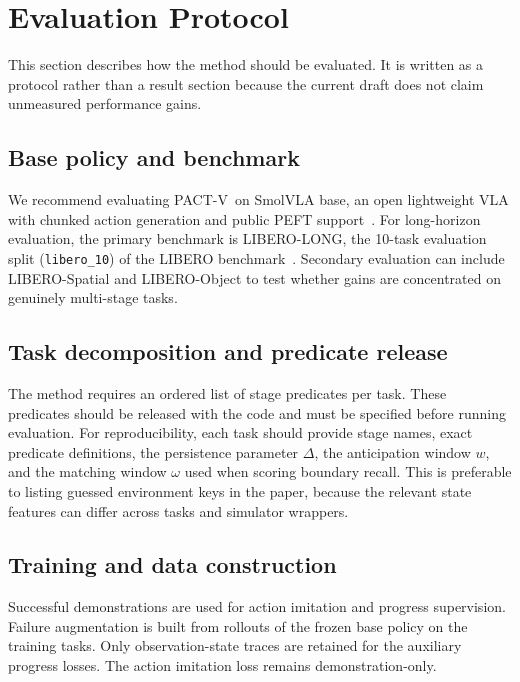 \documentclass[10pt]{article}
\newcommand{\method}{\textsc{PACT-V}\xspace}
\begin{document}
\section{Evaluation Protocol}
\label{sec:eval}

This section describes how the method should be evaluated.
It is written as a protocol rather than a result section because the current
draft does not claim unmeasured performance gains.

\subsection{Base policy and benchmark}

We recommend evaluating \method\ on SmolVLA base, an open lightweight VLA with
chunked action generation and public PEFT support~\cite{msplora}.
For long-horizon evaluation, the primary benchmark is LIBERO-LONG, the
10-task evaluation split (\texttt{libero\_10}) of the LIBERO benchmark~\cite{libero}.
Secondary evaluation can include LIBERO-Spatial and LIBERO-Object to test whether
gains are concentrated on genuinely multi-stage tasks.

\subsection{Task decomposition and predicate release}

The method requires an ordered list of stage predicates per task.
These predicates should be released with the code and must be specified before
running evaluation.
For reproducibility, each task should provide stage names, exact predicate
definitions, the persistence parameter $\Delta$, the anticipation window $w$,
and the matching window $\omega$ used when scoring boundary recall.
This is preferable to listing guessed environment keys in the paper, because the
relevant state features can differ across tasks and simulator wrappers.

\subsection{Training and data construction}

Successful demonstrations are used for action imitation and progress
supervision.
Failure augmentation is built from rollouts of the frozen base policy on the
training tasks.
Only observation-state traces are retained for the auxiliary progress losses.
The action imitation loss remains demonstration-only.
\end{document}
